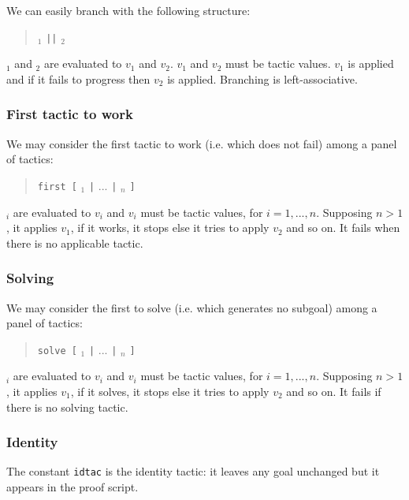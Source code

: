 We can easily branch with the following structure:
\begin{quote}
{\tacexpr}$_1$ {\tt ||} {\tacexpr}$_2$
\end{quote}
{\tacexpr}$_1$ and {\tacexpr}$_2$ are evaluated to $v_1$ and
$v_2$. $v_1$ and $v_2$ must be tactic values. $v_1$ is applied and if
it fails to progress then $v_2$ is applied. Branching is left-associative.

\subsubsection[First tactic to work]{First tactic to work
}

We may consider the first tactic to work (i.e. which does not fail) among a
panel of tactics:
\begin{quote}
{\tt first [} {\tacexpr}$_1$ {\tt |} $...$ {\tt |} {\tacexpr}$_n$ {\tt ]}
\end{quote}
{\tacexpr}$_i$ are evaluated to $v_i$ and $v_i$ must be tactic values, for 
$i=1,...,n$. Supposing $n>1$, it applies $v_1$, if it works, it stops else it
tries to apply $v_2$ and so on. It fails when there is no applicable tactic.

\ErrMsg {}

\subsubsection[Solving]{Solving
}

We may consider the first to solve (i.e. which generates no subgoal) among a
panel of tactics:
\begin{quote}
{\tt solve [} {\tacexpr}$_1$ {\tt |} $...$ {\tt |} {\tacexpr}$_n$ {\tt ]}
\end{quote}
{\tacexpr}$_i$ are evaluated to $v_i$ and $v_i$ must be tactic values, for 
$i=1,...,n$. Supposing $n>1$, it applies $v_1$, if it solves, it stops else it
tries to apply $v_2$ and so on. It fails if there is no solving tactic.

\ErrMsg {}

\subsubsection[Identity]{Identity
}

The constant {\tt idtac} is the identity tactic: it leaves any goal
unchanged but it appears in the proof script.

